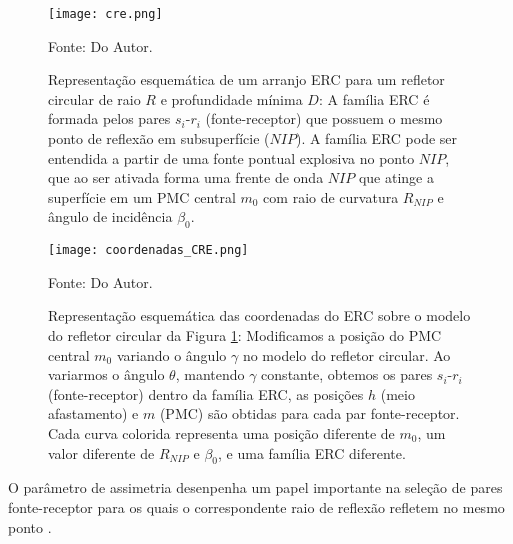 \begin{figure}[htb]
\caption{Representação esquemática de um arranjo ERC para um refletor circular de raio $R$ e profundidade
mínima $D$: A família ERC é formada pelos pares $s_i$-$r_i$ (fonte-receptor) que possuem o mesmo ponto de
reflexão em subsuperfície ($NIP$). A família ERC pode ser entendida a partir de uma fonte pontual explosiva
no ponto $NIP$, que ao ser ativada forma uma frente de onda $NIP$ que atinge a superfície em um PMC central 
$m_0$ com raio de curvatura $R_{NIP}$ e ângulo de incidência $\beta_0$.}
\begin{center}
\texttt{[image: cre.png]}
\vspace{-0.3cm}
\end{center}
\begin{center}
 Fonte: Do Autor.
\end{center}
\label{fig:4.1}
\end{figure}


\begin{figure}[htb]
\caption{Representação esquemática das coordenadas do ERC sobre o modelo do refletor circular da Figura \ref{fig:4.1}:
Modificamos a posição do PMC central $m_0$ variando o ângulo $\gamma$ no modelo do refletor circular.
Ao variarmos o ângulo $\theta$, mantendo $\gamma$ constante, obtemos os pares $s_i$-$r_i$ (fonte-receptor)
dentro da família
ERC, as posições $h$ (meio afastamento) e $m$ (PMC) são obtidas para cada par fonte-receptor.
Cada curva colorida representa uma posição
diferente de $m_0$, um valor diferente de $R_{NIP}$ e $\beta_0$, e uma família ERC diferente.}
\begin{center}
\texttt{[image: coordenadas\_CRE.png]}
\vspace{-0.3cm}
\end{center}
\begin{center}
 Fonte: Do Autor.
\end{center}
\label{fig:4.2}
\end{figure}





O parâmetro de assimetria desenpenha um papel importante na seleção de pares fonte-receptor para os quais
o correspondente raio de reflexão refletem no mesmo ponto \cite{tygel}.




